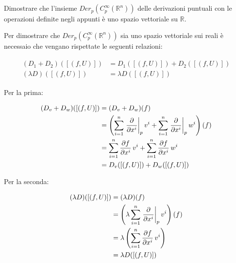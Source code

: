 \tocless\section{}\label{es1-8}

\begin{tcolorbox}
	Dimostrare che l'insieme $ Der_{p}(C_{p}^{\infty}(\mathbb{R}^{n})) $ delle derivazioni puntuali con le operazioni definite negli appunti è uno spazio vettoriale su $ \mathbb{R} $.
\end{tcolorbox}

Per dimostrare che $ Der_{p}(C_{p}^{\infty}(\mathbb{R}^{n})) $ sia uno spazio vettoriale sui reali è necessaio che vengano rispettate le seguenti relazioni:

\begin{align}
	\begin{split}
		(D_{1} + D_{2}) ([(f,U)]) &= D_{1}([(f,U)]) + D_{2}([(f,U)])\\
		(\lambda D) ([(f,U)]) &= \lambda D ([(f,U)])
	\end{split}
\end{align}

Per la prima:

\begin{align}
	\begin{split}
		(D_{v} + D_{w}) ([(f,U)]) &= (D_{v} + D_{w}) (f)\\
		&= \left( \sum_{i=1}^{n} \eval{ \pdv{x^{i}} }_{p} v^{i} + \sum_{i=1}^{n} \eval{ \pdv{x^{i}} }_{p} w^{i} \right) (f)\\
		&= \sum_{i=1}^{n} \pdv{f}{x^{i}} (p) \, v^{i} + \sum_{i=1}^{n} \pdv{f}{x^{i}} (p) \, w^{i}\\
		&= D_{v}([(f,U)]) + D_{w}([(f,U)])
	\end{split}
\end{align}

Per la seconda:

\begin{align}
	\begin{split}
		(\lambda D) ([(f,U)])  &= (\lambda D) (f)\\
		&= \left( \lambda \sum_{i=1}^{n} \eval{ \pdv{x^{i}} }_{p} v^{i} \right) (f)\\
		&= \lambda \left( \sum_{i=1}^{n} \pdv{f}{x^{i}} (p) \, v^{i} \right)\\
		&= \lambda D ([(f,U)])
	\end{split}
\end{align}

\tocless\section{}\label{es1-9}

